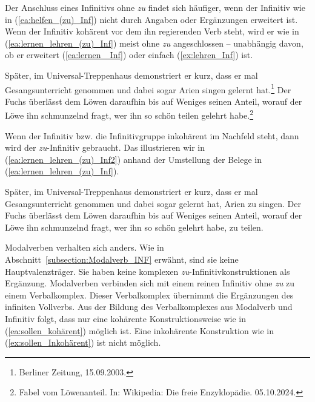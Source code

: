 Der Anschluss eines Infinitivs ohne \textit{zu} findet sich häufiger, wenn der Infinitiv wie in (\ref{ea:helfen_(zu)_Inf}) nicht durch Angaben oder Ergänzungen erweitert ist. Wenn der Infinitiv kohärent vor dem ihn regierenden Verb steht, wird er wie in (\ref{ea:lernen_lehren_(zu)_Inf}) meist ohne \textit{zu} angeschlossen – unabhängig davon, ob er erweitert (\ref{ea:lernen _Inf}) oder einfach (\ref{ex:lehren_Inf}) ist.


\ea \label{ea:lernen_lehren_(zu)_Inf}
\ea \label{ea:lernen _Inf}  Später, im Universal-Treppenhaus demonstriert er kurz, dass er mal Gesangsunterricht genommen und dabei sogar Arien singen gelernt hat.\footnote{Berliner Zeitung, 15.09.2003.}
\ex \label{ex:lehren_Inf}  Der Fuchs überlässt dem Löwen daraufhin bis auf Weniges seinen Anteil, worauf der Löwe ihn schmunzelnd fragt, wer ihn so schön teilen gelehrt habe.\footnote{Fabel vom Löwenanteil. In: Wikipedia: Die freie Enzyklopädie. 05.10.2024.}
\z 
\z 

Wenn der Infinitiv bzw. die Infinitivgruppe inkohärent im Nachfeld steht, dann wird der \textit{zu}-Infinitiv gebraucht. Das illustrieren wir in (\ref{ea:lernen_lehren_(zu)_Inf2}) anhand der Umstellung der Belege in (\ref{ea:lernen_lehren_(zu)_Inf}). 

\ea \label{ea:lernen_lehren_(zu)_Inf2}
\ea \label{ea:lernen _Inf2}  Später, im Universal-Treppenhaus demonstriert er kurz, dass er mal Gesangsunterricht genommen und dabei sogar gelernt hat, Arien zu singen.
\ex \label{ex:lehren_Inf2}  Der Fuchs überlässt dem Löwen daraufhin bis auf Weniges seinen Anteil, worauf der Löwe ihn schmunzelnd fragt, wer ihn so schön gelehrt habe, zu teilen.
\z 
\z 


Modalverben verhalten sich anders. Wie in Abschnitt~\ref{subsection:Modalverb_INF} erwähnt, sind sie keine Hauptvalenzträger. Sie haben keine komplexen \textit{zu}-Infinitivkonstruktionen als Ergänzung. Modalverben verbinden sich mit einem reinen Infinitiv ohne \textit{zu} zu einem Verbalkomplex. Dieser Verbalkomplex übernimmt die Ergänzungen des infiniten Vollverbs.  Aus der Bildung des Verbalkomplexes aus Modalverb und Infinitiv folgt, dass nur eine kohärente Konstruktionsweise wie in (\ref{ea:sollen_kohärent}) möglich ist. Eine inkohärente Konstruktion wie in (\ref{ex:sollen_Inkohärent}) ist nicht möglich.

\ea 
{}\label{ea:sollen_kohärent}
\label{ex:sollen_Inkohärent}
\z 
\z
 
